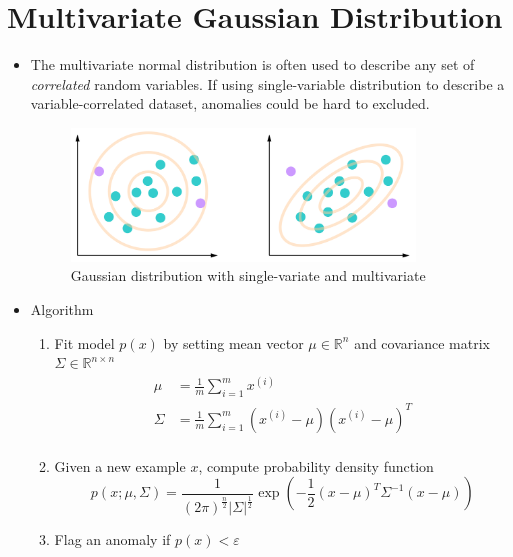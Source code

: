 \section{Multivariate Gaussian Distribution}
\begin{itemize}
    \item The multivariate normal distribution is often used to describe any set of \emph{correlated} random variables.
    If using single-variable distribution to describe a variable-correlated dataset, 
    anomalies could be hard to excluded.
    \begin{figure}[!htbp]
        \centering
        \includegraphics[width=3.6in]{./images/twoDistributionModel.png}
        \caption{Gaussian distribution with single-variate and multivariate}
    \end{figure}
    
    \item Algorithm
    \begin{enumerate}
        \item Fit model $p(x)$ by setting mean vector $\mu\in\mathbb{R}^n$ and covariance matrix $\Sigma\in\mathbb{R}^{n\times n}$
        \begin{equation}
            \begin{aligned}
                \mu    &= \frac{1}{m}\sum_{i=1}^{m} x^{(i)} \\
                \Sigma &= \frac{1}{m}\sum_{i=1}^{m} \left(x^{(i)} - \mu\right) \left(x^{(i)} - \mu\right)^T \\
            \end{aligned}
        \end{equation}

        \item Given a new example $x$, compute probability density function
        \begin{equation}
            p(x; \mu, \Sigma) = \frac{1}{ \left(2\pi\right)^{ \frac{n}{2} } \left|{\Sigma}\right|^{\frac{1}{2}}} \exp{\left(-\frac{1}{2}\left(x-\mu\right)^T\Sigma^{-1}\left(x-\mu\right)\right)}
        \end{equation}

        \item Flag an anomaly if $p(x)<\varepsilon$
    \end{enumerate}


\end{itemize}
